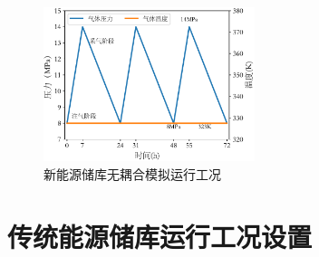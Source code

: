\begin{figure}[ht!]
    \centering
    \includegraphics[width=0.55\textwidth]{img/chap5/压气蓄能库运行工况无耦合.pdf}
    \caption{新能源储库无耦合模拟运行工况}
    \label{fig:5-16}
\end{figure}



\section{传统能源储库运行工况设置}

